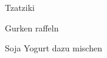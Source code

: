 
\begin{recipe}[]{Tzatziki}{}{}



\step%
Gurken raffeln

\step%
Soja Yogurt dazu mischen

\end{recipe}
